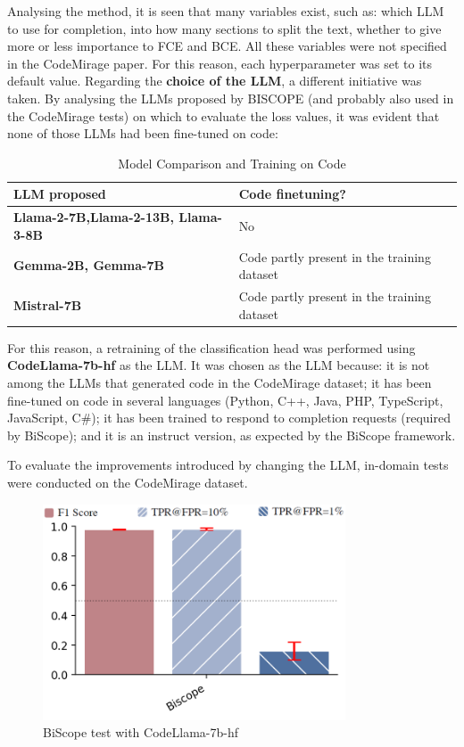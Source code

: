 Analysing the method, it is seen that many variables exist, such as: 
which LLM to use for completion, into how many sections to split 
the text, whether to give more or less importance to FCE and BCE. 
All these variables were not specified in the CodeMirage paper. 
For this reason, each hyperparameter was set to its default value.
Regarding the \textbf{choice of the LLM}, a different initiative was taken. 
By analysing the LLMs proposed by BISCOPE (and probably also used in the 
CodeMirage tests) on which to evaluate the loss values, it was evident 
that none of those LLMs had been fine-tuned on code:

\begin{table}[ht]
\centering
\begin{tabular}{|p{}|p{}|}
\hline
\textbf{LLM proposed} & \textbf{Code finetuning?}  \\
\hline
\textbf{Llama-2-7B\cite{touvron2023llama},Llama-2-13B\cite{touvron2023llama}, Llama-3-8B\cite{dubey2024llama}} & No  \\
\hline
\textbf{Gemma-2B\cite{team2024gemma}, Gemma-7B\cite{team2024gemma}} & Code partly present in the training dataset \\
\hline
\textbf{Mistral-7B\cite{jiang2023mistral}} & Code partly present in the training dataset  \\
\hline
\end{tabular}
\caption{Model Comparison and Training on Code}
\label{tab:modelli_codice}
\end{table}

For this reason, a retraining of the classification head was 
performed using \textbf{CodeLlama-7b-hf} \cite{roziere2023code} as the LLM.
It was chosen as the LLM because: it is not among the LLMs that generated 
code in the CodeMirage dataset; it has been fine-tuned on code in several 
languages (Python, C++, Java, PHP, TypeScript, JavaScript, C\#); it has been 
trained to respond to completion requests (required by BiScope); and it is an 
instruct version, as expected by the BiScope framework.

To evaluate the improvements introduced by changing the LLM, in-domain 
tests were conducted on the CodeMirage dataset.
\begin{figure}[H]
    \centering
    \includegraphics[width=0.8\textwidth]{img/BiScope/test_noramle_migliorato.png}
    \caption{BiScope test with CodeLlama-7b-hf}
    \label{fig:BiScope-CodeLlama-7b-hf test}
\end{figure}

